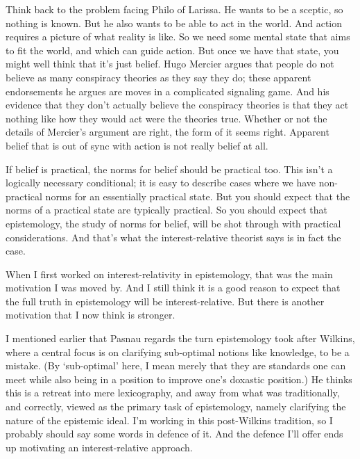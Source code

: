 \documentclass[
  11pt,
]{book}
\begin{document}
Think back to the problem facing Philo of Larissa. He wants to be a sceptic, so nothing is known. But he also wants to be able to act in the world. And action requires a picture of what reality is like. So we need some mental state that aims to fit the world, and which can guide action. But once we have that state, you might well think that it's just belief. Hugo Mercier \citeyearpar{Mercier2020} argues that people do not believe as many conspiracy theories as they say they do; these apparent endorsements he argues are moves in a complicated signaling game. And his evidence that they don't actually believe the conspiracy theories is that they act nothing like how they would act were the theories true. Whether or not the details of Mercier's argument are right, the form of it seems right. Apparent belief that is out of sync with action is not really belief at all.

If belief is practical, the norms for belief should be practical too. This isn't a logically necessary conditional; it is easy to describe cases where we have non-practical norms for an essentially practical state. But you should expect that the norms of a practical state are typically practical. So you should expect that epistemology, the study of norms for belief, will be shot through with practical considerations. And that's what the interest-relative theorist says is in fact the case.

When I first worked on interest-relativity in epistemology, that was the main motivation I was moved by. And I still think it is a good reason to expect that the full truth in epistemology will be interest-relative. But there is another motivation that I now think is stronger.

I mentioned earlier that Pasnau regards the turn epistemology took after Wilkins, where a central focus is on clarifying sub-optimal notions like knowledge, to be a mistake. (By `sub-optimal' here, I mean merely that they are standards one can meet while also being in a position to improve one's doxastic position.) He thinks this is a retreat into mere lexicography, and away from what was traditionally, and correctly, viewed as the primary task of epistemology, namely clarifying the nature of the epistemic ideal. I'm working in this post-Wilkins tradition, so I probably should say some words in defence of it. And the defence I'll offer ends up motivating an interest-relative approach.
\end{document}
